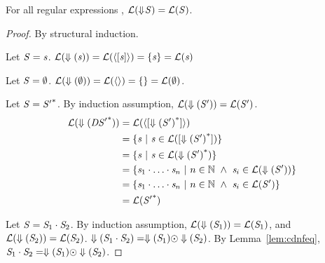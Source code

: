 \documentclass[acmsmall,screen,anonymous]{acmart}
\begin{document}
\begin{theorem}\label{ConversionPreservesSemantics}
  For all regular expressions \Regex{},
  $\mathcal{L}(\Downarrow\mkern-4mu \mathit{S})=\mathcal{L}(\mathit{S}{})$.
\end{theorem}
\begin{proof}
  By structural induction.

  Let $\mathit{S}=\mathit{s}$.
  $\mathcal{L}(\Downarrow(\mathit{s}))=\mathcal{L}(\langle[\mathit{s}]\rangle)=
  \{\mathit{s}\}=\mathcal{L}(\mathit{s})$

  Let $\mathit{S}=\emptyset$.
  $\mathcal{L}(\Downarrow(\emptyset))=\mathcal{L}(\langle\rangle) =
  \{\} = \mathcal{L}(\emptyset)$.

  Let $\mathit{S}={\mathit{S}'}^*$.
  By induction assumption, $\mathcal{L}(\Downarrow(\mathit{S}'))=
  \mathcal{L}(\mathit{S}')$.
  \begin{align*}
    \mathcal{L}(\Downarrow({\mathit{DS}'}^*)) & =
                                                    \mathcal{L}(\langle[{\Downarrow(\mathit{S}')}^*]\rangle)\\
                                                  & =
                                                    \{\mathit{s}~|~\mathit{s}\in
                                                    \mathcal{L}([{\Downarrow(\mathit{S}')}^*])\}\\
                                                  & = 
                                                    \{\mathit{s}~|~{} \mathit{s}\in\mathcal{L}({\Downarrow(\mathit{S}')}^*)\}\\
                                                  & =
                                                    \{\mathit{s}_1\cdot\ldots\cdot\mathit{s}_n~|~{}
                                                    n\in\mathbb{N} ~\wedge~\mathit{s}_i\in\mathcal{L}(\Downarrow(\mathit{S}'))\}\\
                                                  & =
                                                    \{\mathit{s}_1\cdot\ldots\cdot\mathit{s}_n~|~{}
                                                    n\in\mathbb{N}~\wedge~\mathit{s}_i\in\mathcal{L}(\mathit{S}')\}\\
                                                  & = \mathcal{L}({\mathit{S}'}^*)
  \end{align*}

  Let $\mathit{S}=\mathit{S}_1\cdot\mathit{S}_2$.
  By induction assumption,
  $\mathcal{L}(\Downarrow(\mathit{S}_1))=\mathcal{L}(\mathit{S}_1)$, and
  $\mathcal{L}(\Downarrow(\mathit{S}_2))=\mathcal{L}(\mathit{S}_2)$.
  $\Downarrow(\mathit{S}_1\cdot\mathit{S}_2)=
  \Downarrow(\mathit{S}_1)\odot\Downarrow(\mathit{S}_2)$.
  By Lemma~\ref{lem:cdnfeq},
  $\mathit{S}_1\cdot\mathit{S}_2=
  \Downarrow(\mathit{S}_1)\odot\Downarrow(\mathit{S}_2)$.



\end{proof}
\end{document}
